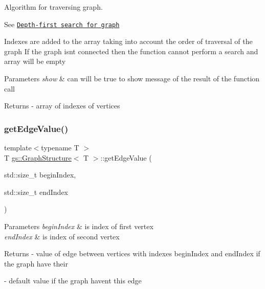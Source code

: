 Algorithm for traversing graph. 

See \href{https://en.wikipedia.org/wiki/Depth-first_search}{\tt Depth-\/first search for graph}

Indexes are added to the array taking into account the order of traversal of the graph If the graph isn\textquotesingle{}t connected then the function cannot perform a search and array will be empty 
\begin{DoxyParams}{Parameters}
{\em show} & can will be true to show message of the result of the function call \\
\hline
\end{DoxyParams}
\begin{DoxyReturn}{Returns}
-\/ array of indexes of vertices 
\end{DoxyReturn}
\mbox{\label{classgs_1_1_graph_structure_ac2e23f51a131b5a08d96cb8c75f20cea}} 
\subsubsection{\texorpdfstring{get\+Edge\+Value()}{getEdgeValue()}}
{\footnotesize\ttfamily template$<$typename T $>$ \\
T \mbox{\hyperlink{classgs_1_1_graph_structure}{gs\+::\+Graph\+Structure}}$<$ T $>$\+::get\+Edge\+Value (\begin{DoxyParamCaption}\item[{std\+::size\+\_\+t}]{begin\+Index,  }\item[{std\+::size\+\_\+t}]{end\+Index }\end{DoxyParamCaption})}


\begin{DoxyParams}{Parameters}
{\em begin\+Index} & is index of first vertex \\
\hline
{\em end\+Index} & is index of second vertex \\
\hline
\end{DoxyParams}
\begin{DoxyReturn}{Returns}
-\/ value of edge between vertices with indexes \textquotesingle{}begin\+Index\textquotesingle{} and \textquotesingle{}end\+Index\textquotesingle{} if the graph have their 

-\/ default value if the graph haven\textquotesingle{}t this edge 
\end{DoxyReturn}
\mbox{\label{classgs_1_1_graph_structure_ab7f63de5d83e392689eb9e10f776c848}} 
